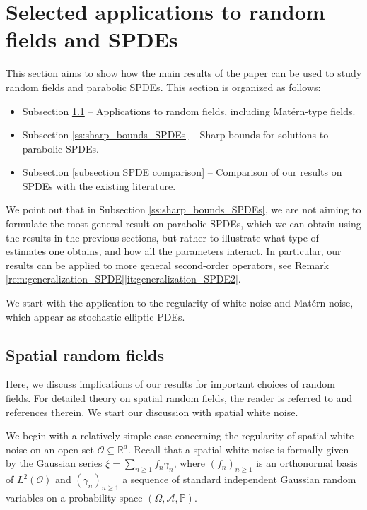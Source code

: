 \documentclass[reqno]{amsart}
\theoremstyle{plain}
\theoremstyle{remark}
\theoremstyle{plain}
\numberwithin{equation}{section}
\renewcommand\P{\mathbb{P}}
\newcommand\cO{\mathcal{O}}
\def\R{{\mathbb R}}
\renewcommand{\P}{{\mathbb P}}
\newcommand{\g}{\gamma}
\renewcommand{\O}{\Omega}
\newcommand{\1}{\one}
\begin{document}
\section{Selected applications to random fields and SPDEs}
\label{sec: SPDE section}
This section aims to show how the main results of the paper can be used to study random fields and parabolic SPDEs. 
This section is organized as follows:
\begin{itemize}
    \item Subsection \ref{ss:random_field} -- Applications to random fields, including Mat\'ern-type fields.
    \item Subsection \ref{ss:sharp_bounds_SPDEs} -- Sharp bounds for solutions to parabolic SPDEs.
    \item Subsection \ref{subsection SPDE comparison} -- Comparison of our results on SPDEs with the existing literature. 
\end{itemize}
We point out that in Subsection \ref{ss:sharp_bounds_SPDEs}, we are not aiming to formulate the most general result on parabolic SPDEs, which we can obtain using the results in the previous sections, but rather to illustrate what type of estimates one obtains, and how all the parameters interact. In particular, our results can be applied to more general second-order operators, see Remark \ref{rem:generalization_SPDE}\eqref{it:generalization_SPDE2}.

We start with the application to the regularity of white noise and Mat\'ern noise, which appear as stochastic elliptic PDEs.

\subsection{Spatial random fields}
\label{ss:random_field}
Here, we discuss implications of our results for important choices of random fields. 
For detailed theory on spatial random fields, the reader is referred to 
\cite{AdlTay, AzFag20, cioica2010spatial, CDDKLRRS, FagFalUn, LangSch, LRL, RueHel} and references therein.  We start our discussion with spatial white noise. 

\smallskip

We begin with a relatively simple case concerning the regularity of spatial white noise on an open set $\cO\subseteq \R^d$. Recall that a spatial white noise is formally given by the Gaussian series $\xi=\sum_{n\geq 1} f_n \g_n$, where $(f_n)_{n\geq 1}$ is an orthonormal basis of $L^2(\cO)$ and $(\g_n)_{n\geq 1}$ a sequence of standard independent Gaussian random variables on a probability space $(\O,\mathcal{A},\P)$.
\end{document}
